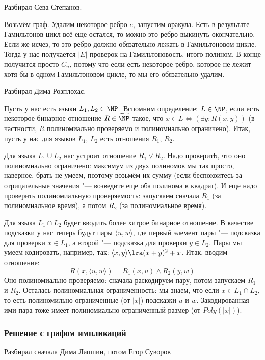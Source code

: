 	Разбирал Сева Степанов.

	Возьмём граф.
	Удалим некоторое ребро $e$, запустим оракула.
	Есть в результате Гамильтонов цикл всё еще остался, то можно это ребро выкинуть окончательно.
	Если же исчез, то это ребро должно обязательно лежать в Гамильтоновом цикле.
	Тогда у нас получается $|E|$ проверок на Гамильтоновость, итого полином.
	В конце получится просто $C_n$, потому что если есть некоторое ребро, которое не лежит хотя
	бы в одном Гамильтоновом цикле, то мы его обязательно удалим.

	Разбирал Дима Розплохас.

	Пусть у нас есть языки $L_1, L_2 \in \NP$.
	Вспомним определение: $L \in \NP$, если есть некоторое бинарное отношение $R \in \widetilde{\NP}$
	такое, что $x \in L \iff (\exists y \colon R(x, y))$ (в частности, $R$ полиномиально проверяемо
	и полиномиально ограничено).
	Итак, пусть у нас для языков $L_1$, $L_2$ есть отношения $R_1$, $R_2$.

	Для языка $L_1 \cup L_2$ нас устроит отношение $R_1 \lor R_2$.
	Надо проверитЬ, что оно полиномиально ограничено: максимум из двух полиномов мы так просто, наверное, брать не умеем,
	поэтому возьмём их сумму (если беспокоитесь за отрицательные значения "--- возведите еще оба полинома в квадрат).
	И еще надо проверить полиномиальную проверяемость: запускаем сначала $R_1$ (за полиномиальное время),
	а потом $R_2$ (за полиномиальное время).

	Для языка $L_1 \cap L_2$ будет вводить более хитрое бинарное отношение.
	В качестве подсказки у нас теперь будут пары $\langle u, w \rangle$,
	где первый элемент пары "--- подсказка для проверки $x \in L_1$,
	а второй "--- подсказка для проверки $y \in L_2$.
	Пары мы умеем кодировать, например, так: $\langle x, y \rangle \lra (x+y)^2+x$.
	Итак, вводим отношение:
	\[ R(x, \langle u, w \rangle) = R_1(x, u) \land R_2(y, w) \]
	Оно полиномиально проверяемо: сначала раскодируем пару, потом запускаем $R_1$ и $R_2$.
	Осталась полиномиальная ограниченность: мы знаем, что если $x \in L_1 \cap L_2$,
	то есть полиномильно ограниченные (от $|x|$) подсказки $u$ и $w$.
	Закодированная ими пара тоже имеет полиномиально ограниченный размер (от $Poly(|x|)$).

\subsubsection{Решение с графом импликаций}
	Разбирал сначала Дима Лапшин, потом Егор Суворов

